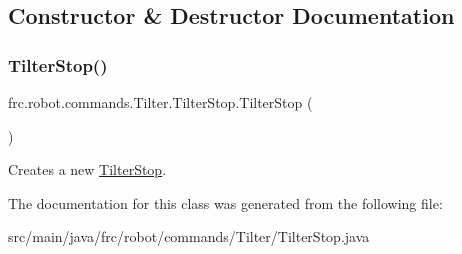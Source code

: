 \subsection{Constructor \& Destructor Documentation}
\mbox{\label{classfrc_1_1robot_1_1commands_1_1_tilter_1_1_tilter_stop_a03670499a1e85fd5601387b6b1e55bdd}} 
\subsubsection{\texorpdfstring{TilterStop()}{TilterStop()}}
{\footnotesize\ttfamily frc.\+robot.\+commands.\+Tilter.\+Tilter\+Stop.\+Tilter\+Stop (\begin{DoxyParamCaption}{ }\end{DoxyParamCaption})\hspace{0.3cm}{\ttfamily [inline]}}

Creates a new \mbox{\hyperlink{classfrc_1_1robot_1_1commands_1_1_tilter_1_1_tilter_stop}{Tilter\+Stop}}. 

The documentation for this class was generated from the following file\+:\begin{DoxyCompactItemize}
\item 
src/main/java/frc/robot/commands/\+Tilter/Tilter\+Stop.\+java\end{DoxyCompactItemize}
